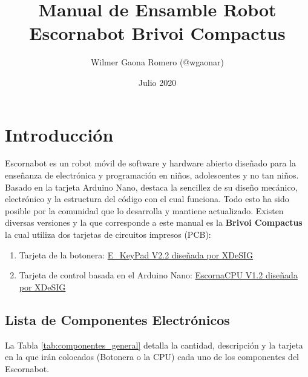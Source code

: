 \documentclass{article}
\title{Manual de Ensamble Robot Escornabot Brivoi Compactus}
\author{Wilmer Gaona Romero (@wgaonar)}
\date{Julio 2020}
\begin{document}
\maketitle

\section{Introducción}
Escornabot es un robot móvil de software y hardware abierto diseñado para la enseñanza de electrónica y programación en niños, adolescentes y no tan niños. Basado en la tarjeta Arduino Nano, destaca la sencillez de su diseño mecánico, electrónico y la estructura del código con el cual funciona. Todo esto ha sido posible por la comunidad que lo desarrolla y mantiene actualizado. Existen diversas versiones y la que corresponde a este manual es la \textbf{Brivoi Compactus} la cual utiliza dos tarjetas de circuitos impresos (PCB):

\begin{enumerate}
     \item Tarjeta de la botonera: \href{https://github.com/xdesig/escornabot-electronics/tree/master/Electronics/E_KEYPAD/E_KEYPAD_2.20}{E\_KeyPad V2.2 diseñada por XDeSIG}
     \item Tarjeta de control basada en el Arduino Nano:
     \href{https://github.com/xdesig/escornabot-electronics/tree/master/Electronics/EscornaCPU/1.x/1.20}{EscornaCPU V1.2 diseñada por XDeSIG}
\end{enumerate}

\subsection{Lista de Componentes Electrónicos}
La Tabla \ref{tab:componentes_general} detalla la cantidad, descripción y la tarjeta en la que irán colocados (Botonera o la CPU) cada uno de los componentes del Escornabot. 
\end{document}
